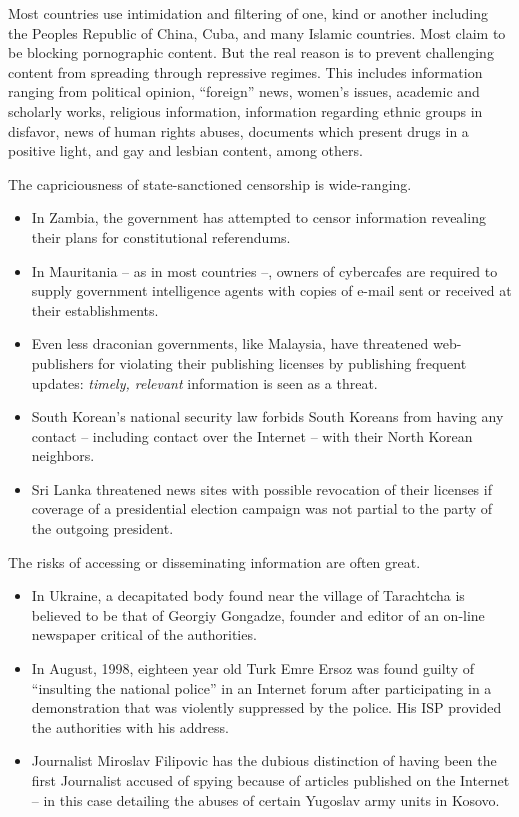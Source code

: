\documentclass[letterpaper,12pt,english]{sphinxmanual}
\begin{document}
Most countries use intimidation and filtering of one, kind or another including the Peoples Republic of China, Cuba, and many Islamic countries. Most claim to be blocking pornographic content. But the real reason is to prevent challenging content from spreading through repressive regimes. This includes information ranging from political opinion, ``foreign'' news, women's issues, academic and scholarly works, religious information, information regarding ethnic groups in disfavor, news of human rights abuses, documents which present drugs in a positive light, and gay and lesbian
content, among others.

The capriciousness of state-sanctioned censorship is wide-ranging.
\begin{itemize}
\item {} 
In Zambia, the government has attempted to censor information revealing their plans for constitutional referendums.

\item {} 
In Mauritania -- as in most countries --, owners of cybercafes are required to supply government intelligence agents with copies of e-mail sent or received at their establishments.

\item {} 
Even less draconian governments, like Malaysia, have threatened web-publishers for violating their publishing licenses by publishing frequent updates: \emph{timely, relevant} information is seen as a threat.

\item {} 
South Korean's national security law forbids South Koreans from having any contact -- including contact over the Internet -- with their North Korean neighbors.

\item {} 
Sri Lanka threatened news sites with possible revocation of their licenses if coverage of a presidential election campaign was not partial to the party of the outgoing president.

\end{itemize}

The risks of accessing or disseminating information are often great.
\begin{itemize}
\item {} 
In Ukraine, a decapitated body found near the village of Tarachtcha is believed to be that of Georgiy Gongadze, founder and editor of an on-line newspaper critical of the authorities.

\item {} 
In August, 1998, eighteen year old Turk Emre Ersoz was found guilty of ``insulting the national police'' in an Internet forum after participating in a demonstration that was violently suppressed by the police.  His ISP provided the authorities with his address.

\item {} 
Journalist Miroslav Filipovic has the dubious distinction of having been the first Journalist accused of spying because of articles published on the Internet -- in this case detailing the abuses of certain Yugoslav army units in Kosovo.

\end{itemize}
\end{document}
